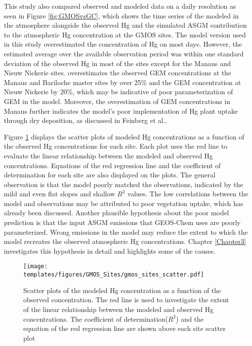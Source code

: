 \begin{flushleft}


 This study also compared observed and modeled data on a daily resolution as seen in Figure \ref{fig:GMOSvsGC}, which shows the time series of the modeled \hgc in the atmosphere alongside the observed Hg and the simulated ASGM contribution to the atmospheric Hg concentration at the GMOS sites. The \gc model version used in this study overestimated the concentration of Hg on most days. However, the \gc estimated average \hgc over the available observation period was within one standard deviation of the observed Hg in most of the sites except for the Manaus and Nieuw Nickerie sites. \gcs overestimates the observed GEM concentrations at the Manaus and Bariloche master sites by over 25\%  and the GEM concentration at Nieuw Nickerie by 20\%, which may be indicative of poor parameterization of GEM in the model. Moreover, the overestimation of GEM concentrations in Manaus further indicates the model's poor implementation of Hg plant uptake through dry deposition, as discussed in Feinberg et al.\cite{feinberg_evaluating_2022}.
\end{flushleft}

\begin{flushleft}
 Figure \ref{fig:gmos_sites_scatter} displays the scatter plots of modeled Hg concentrations as a function of the observed Hg concentrations for each site. Each plot uses the red line to evaluate the linear relationship between the modeled and observed Hg concentrations. Equations of the red regression line and the coefficient of determination for each site are also displayed on the plots. The general observation is that the model poorly matched the observations, indicated by the  mild and even flat slopes and shallow $R^2$ values. The low correlations between the model and observations may be attributed to poor vegetation uptake, which has already been discussed\cite{feinberg_evaluating_2022}. Another plausible hypothesis about the poor model prediction is that the input ASGM emissions that GEOS-Chem uses are poorly parameterized. Wrong emissions in the model may reduce the extent to which the model recreates the observed atmospheric Hg concentrations. Chapter \ref{Chapter3} investigates this hypothesis in detail and highlights some of the causes.
 \end{flushleft}


 \begin{figure}[H]
\texttt{[image: templates/figures/GMOS\_Sites/gmos\_sites\_scatter.pdf]}
\centering
\caption[Scatter plots of the modeled Hg concentration as a function of the observed concentration.]{Scatter plots of the modeled Hg concentration as a function of the observed concentration. The red line is used to investigate the extent of the linear relationship between the modeled and observed Hg concentrations. The coefficient of determination($R^2$) and the equation of the red regression line are shown above each site scatter plot}
\label{fig:gmos_sites_scatter}
\end{figure}
\FloatBarrier

